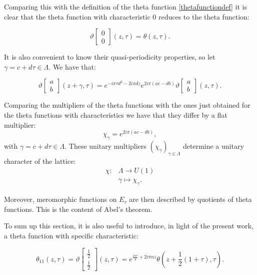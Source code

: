 \documentclass[a4paper,11pt]{article}
\begin{document}
Comparing this with the definition of the theta function \eqref{thetafunctiondef} it is clear that the theta function with characteristic 0 reduces to the theta function:

\begin{equation*}
\vartheta\begin{bmatrix}
0 \\
0 
\end{bmatrix}(z,\tau) = \theta(z,\tau).
\end{equation*}

It is also convenient to know their quasi-periodicity properties, so let $\gamma = c+d\tau\in \Lambda$. We have that:

\begin{equation*}
\vartheta\begin{bmatrix}
a\\
b
\end{bmatrix}(z+\gamma,\tau) = e^{-i\pi\tau d^2-2i\pi dz}e^{2i\pi(ac-db)}\vartheta\begin{bmatrix}
a\\
b
\end{bmatrix}(z,\tau).
\end{equation*}

Comparing the multipliers of the theta functions with the ones just obtained for the theta functions with characteristics we have that they differ by a flat multiplier:
\begin{equation*}
    \chi_{\gamma} = e^{2i\pi(ac-db)},
\end{equation*}
with $\gamma = c+d\tau\in\Lambda$. These unitary multipliers $(\chi_{\gamma})_{\gamma\in\Lambda}$ determine a unitary character of the lattice:
\begin{align*}
    \chi :& \Lambda\rightarrow U(1)\\
    &\gamma\mapsto \chi_{\gamma}.
\end{align*}

Moreover, meromorphic functions on $E_\tau$ are then described by quotients of theta functions. This is the content of Abel's theorem. 

To sum up this section, it is also useful to introduce, in light of the present work, a theta function with specific characteristic:

\begin{equation}
\theta_{11}(z,\tau) = \vartheta\begin{bmatrix}
\frac{1}{2} \\
\frac{1}{2}
\end{bmatrix}(z,\tau) = e^{\frac{i\pi\tau}{4}+2i\pi nz}\theta\left(z+\frac{1}{2}(1+\tau),\tau\right).
\end{equation}
\end{document}
